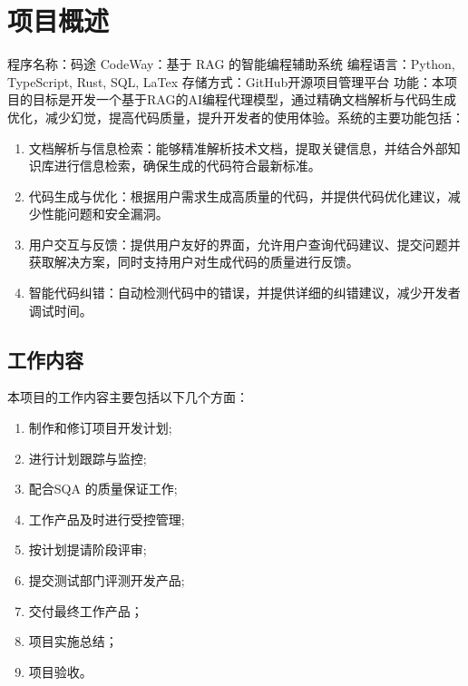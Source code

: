 \documentclass[
    report,     %
    oneside,    %
    UTF8,       %
    zihao=-4    %
]{config} %
\begin{document}
\section{项目概述}
程序名称：码途 CodeWay：基于 RAG 的智能编程辅助系统
编程语言：Python, TypeScript, Rust, SQL, LaTex
存储方式：GitHub开源项目管理平台
功能：本项目的目标是开发一个基于RAG的AI编程代理模型，通过精确文档解析与代码生成优化，减少幻觉，提高代码质量，提升开发者的使用体验。系统的主要功能包括：
\begin{enumerate}
    \item 文档解析与信息检索：能够精准解析技术文档，提取关键信息，并结合外部知识库进行信息检索，确保生成的代码符合最新标准。
    \item 代码生成与优化：根据用户需求生成高质量的代码，并提供代码优化建议，减少性能问题和安全漏洞。
    \item 用户交互与反馈：提供用户友好的界面，允许用户查询代码建议、提交问题并获取解决方案，同时支持用户对生成代码的质量进行反馈。
    \item 智能代码纠错：自动检测代码中的错误，并提供详细的纠错建议，减少开发者调试时间。
\end{enumerate}

\subsection{工作内容}
本项目的工作内容主要包括以下几个方面：
\begin{enumerate}
    \item 制作和修订项目开发计划;
    \item 进行计划跟踪与监控;
    \item 配合SQA 的质量保证工作;
    \item 工作产品及时进行受控管理;
    \item 按计划提请阶段评审;
    \item 提交测试部门评测开发产品;
    \item 交付最终工作产品；
    \item 项目实施总结；
    \item 项目验收。
\end{enumerate}
\end{document}
